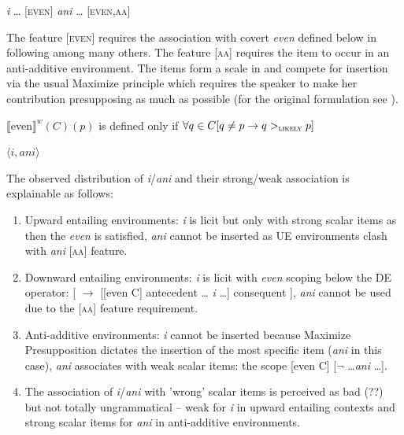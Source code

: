 \documentclass[output=paper, colorlinks, citecolor=brown, newtxmath]{langsci/langscibook}
\begin{document}
\ea \ea \textit{i} {\ldots} [\textsc{even}]
\ex  \textit{ani} {\ldots} [\textsc{even},\textsc{aa}]
\z
\z

\noindent The feature [\textsc{even}] requires the association with covert \textit{even} defined below in  following \cite{crnivc2014against} among many others. The feature [\textsc{aa}] requires the item to occur in an anti-additive environment. The items form a scale in  and compete for insertion via the usual Maximize  principle which requires the speaker to make her contribution presupposing as much as possible (for the original formulation see \citealt{heim1991articles}).

\ea\label{ex-46} $\llbracket$even$\rrbracket^w (C)(p)$ is defined only if
$\forall q \in C[q \neq p \rightarrow q >_{\textsc{likely}} p]$
\z

\ea\label{ex-47} $\langle i,ani\rangle$
\z

\noindent The observed distribution of \textit{i}/\textit{ani} and their strong/weak association is explainable as follows:

\begin{enumerate}
	\item Upward entailing environments: \textit{i} is licit but only with strong scalar items as then the \textit{even}  is satisfied, \textit{ani} cannot be inserted as UE environments clash with \textit{ani} [\textsc{aa}] feature.
	\item Downward entailing environments: \textit{i} is licit with \textit{even} scoping below the DE operator:  {[} $\rightarrow$ {[}{[}even C{]} antecedent \ldots{} \textit{i} \ldots ] consequent ], \textit{ani} cannot be used due to the [\textsc{aa}] feature requirement.
	\item Anti-additive environments: \textit{i} cannot be inserted because Maximize Presupposition dictates the insertion of the most specific item (\textit{ani} in this case), \textit{ani} associates with weak scalar items: the scope [even C] [$\neg$ \ldots  \textit{ani} \ldots].
	\item The association of \textit{i}/\textit{ani} with 'wrong' scalar items is perceived as bad (??) but not totally ungrammatical -- weak  for \textit{i} in upward entailing contexts and strong scalar items for \textit{ani} in anti-additive environments.
\end{enumerate}
\end{document}
